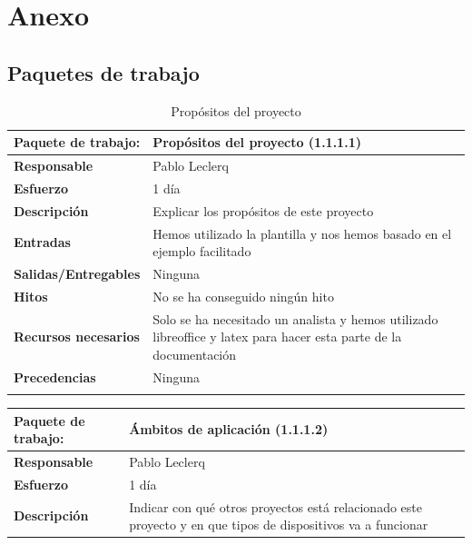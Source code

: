 \documentclass{report}
\begin{document}
    \chapter*{Anexo} %
        \section*{Paquetes de trabajo}
            \begin{center}
                \begin{longtable}{|p{6cm}|p{6cm}|}
                    \hline
                    \textbf{Paquete de trabajo:} & Propósitos del proyecto (1.1.1.1)\\
                    \hline
                    \textbf{Responsable} & Pablo Leclerq\\
                    \hline
                    \textbf{Esfuerzo} & 1 día\\
                    \hline
                    \textbf{Descripción} & Explicar los propósitos de este proyecto\\
                    \hline
                    \textbf{Entradas} & Hemos utilizado la plantilla y nos hemos basado en el ejemplo facilitado\\
                    \hline
                    \textbf{Salidas/Entregables} & Ninguna\\
                    \hline
                    \textbf{Hitos} & No se ha conseguido ningún hito\\
                    \hline
                    \textbf{Recursos necesarios} & Solo se ha necesitado un analista y hemos utilizado libreoffice y latex para hacer esta parte de la documentación\\
                    \hline
                    \textbf{Precedencias} & Ninguna\\
                    \hline
                    \caption{Propósitos del proyecto}
                \end{longtable}
                \begin{longtable}{|p{6cm}|p{6cm}|}
                    \hline
                    \textbf{Paquete de trabajo:} & Ámbitos de aplicación (1.1.1.2)\\
                    \hline
                    \textbf{Responsable} & Pablo Leclerq\\
                    \hline
                    \textbf{Esfuerzo} & 1 día\\
                    \hline
                    \textbf{Descripción} & Indicar con qué otros proyectos está relacionado este proyecto y en que tipos de dispositivos va a funcionar\\

\end{longtable}
\end{center}
\end{document}
